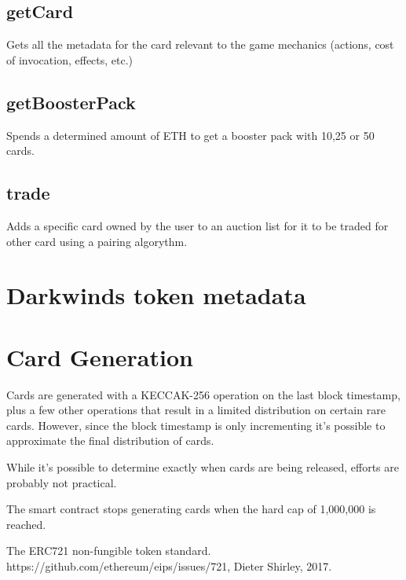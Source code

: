 \documentclass[11pt,twocolumn]{article}
\begin{document}
\subsection{getCard}
Gets all the metadata for the card relevant to the game mechanics (actions, cost of invocation, effects, etc.)
\subsection{getBoosterPack}
Spends a determined amount of ETH to get a booster pack with 10,25 or 50 cards.
\subsection{trade}
Adds a specific card owned by the user to an auction list for it to be traded for other card using a pairing algorythm.

\section{Darkwinds token metadata}
\section{Card Generation}
Cards are generated with a KECCAK-256 operation on the last block timestamp, plus a few other operations that result in a limited distribution on certain rare cards. However, since the block timestamp is only incrementing it's possible to approximate the final distribution of cards.

While it's possible to determine exactly when cards are being released, efforts are probably not practical. 

The smart contract stops generating cards when the hard cap of 1,000,000 is reached.

\onecolumn
\begin{figure}[!htb]
    \centering 

\label{figa2} 
\end{figure}



\begin{thebibliography}{1}

         The ERC721 non-fungible token standard. https://github.com/ethereum/eips/issues/721, Dieter Shirley, 2017.
      
        \end{thebibliography}
\end{document}
